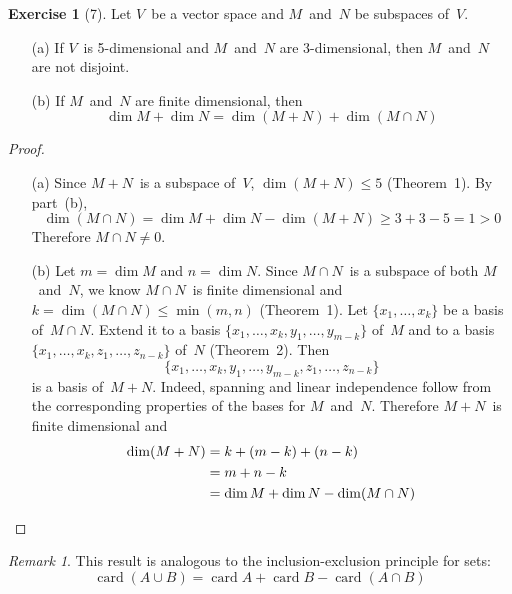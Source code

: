 \documentclass[letterpaper,12pt]{article}
\newcommand{\union}{\cup}
\newcommand{\sect}{\cap}
\DeclareMathOperator{\card}{card}
\theoremstyle{definition}
\newtheorem*{exer}{Exercise}
\theoremstyle{remark}
\newtheorem*{rmk}{Remark}
\theoremstyle{direction}
\begin{document}
\begin{exer}[7]
Let \(V\)~be a vector space and \(M\)~and~\(N\) be subspaces of~\(V\).
\begin{enumerate}
\item[(a)] If \(V\)~is 5-dimensional and \(M\)~and~\(N\) are 3-dimensional, then \(M\)~and~\(N\) are not disjoint.
\item[(b)] If \(M\)~and~\(N\) are finite dimensional, then
\[\dim M+\dim N=\dim(M+N)+\dim(M\sect N)\]
\end{enumerate}
\end{exer}
\begin{proof}\
\begin{enumerate}
\item[(a)] Since \(M+N\)~is a subspace of~\(V\), \(\dim(M+N)\le5\) (Theorem~1). By part~(b),
\[\dim(M\sect N)=\dim M+\dim N-\dim(M+N)\ge3+3-5=1>0\]
Therefore \(M\sect N\ne0\).
\item[(b)] Let \(m=\dim M\) and \(n=\dim N\). Since \(M\sect N\)~is a subspace of both \(M\)~and~\(N\), we know \(M\sect N\)~is finite dimensional and \(k=\dim(M\sect N)\le\min(m,n)\) (Theorem~1). Let \(\{x_1,\ldots,x_k\}\) be a basis of~\(M\sect N\). Extend it to a basis \(\{x_1,\ldots,x_k,y_1,\ldots,y_{m-k}\}\) of~\(M\) and to a basis \(\{x_1,\ldots,x_k,z_1,\ldots,z_{n-k}\}\) of~\(N\) (Theorem~2). Then
\[\{x_1,\ldots,x_k,y_1,\ldots,y_{m-k},z_1,\ldots,z_{n-k}\}\]
is a basis of~\(M+N\). Indeed, spanning and linear independence follow from the corresponding properties of the bases for \(M\)~and~\(N\). Therefore \(M+N\)~is finite dimensional and
\begin{align*}
\dim(M+N)&=k+(m-k)+(n-k)\\
	&=m+n-k\\
	&=\dim M+\dim N-\dim(M\sect N)\qedhere
\end{align*}
\end{enumerate}
\end{proof}
\begin{rmk}
This result is analogous to the inclusion-exclusion principle for sets:
\[\card(A\union B)=\card A+\card B-\card(A\sect B)\]
\end{rmk}

\end{document}
